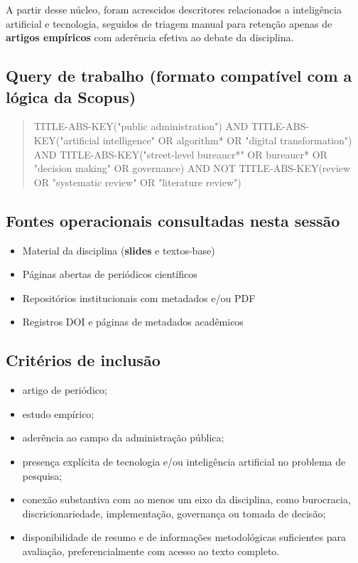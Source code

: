 \documentclass[12pt]{article}
\begin{document}
A partir desse núcleo, foram acrescidos descritores relacionados a inteligência artificial e tecnologia, seguidos de triagem manual para retenção apenas de \textbf{artigos empíricos} com aderência efetiva ao debate da disciplina.

\subsection{Query de trabalho (formato compatível com a lógica da Scopus)}
\label{sec:org7cf57ad}

\begin{quote}
TITLE-ABS-KEY("public administration")
AND TITLE-ABS-KEY("artificial intelligence" OR algorithm* OR "digital transformation")
AND TITLE-ABS-KEY("street-level bureaucr*" OR bureaucr* OR "decision making" OR governance)
AND NOT TITLE-ABS-KEY(review OR "systematic review" OR "literature review")
\end{quote}

\subsection{Fontes operacionais consultadas nesta sessão}
\label{sec:org3479cc7}
\begin{itemize}
\item Material da disciplina (\textbf{slides} e textos-base)
\item Páginas abertas de periódicos científicos
\item Repositórios institucionais com metadados e/ou PDF
\item Registros DOI e páginas de metadados acadêmicos
\end{itemize}

\subsection{Critérios de inclusão}
\label{sec:orgf0baf58}
\begin{itemize}
\item artigo de periódico;
\item estudo empírico;
\item aderência ao campo da administração pública;
\item presença explícita de tecnologia e/ou inteligência artificial no problema de pesquisa;
\item conexão substantiva com ao menos um eixo da disciplina, como burocracia, discricionariedade, implementação, governança ou tomada de decisão;
\item disponibilidade de resumo e de informações metodológicas suficientes para avaliação, preferencialmente com acesso ao texto completo.
\end{itemize}
\end{document}
